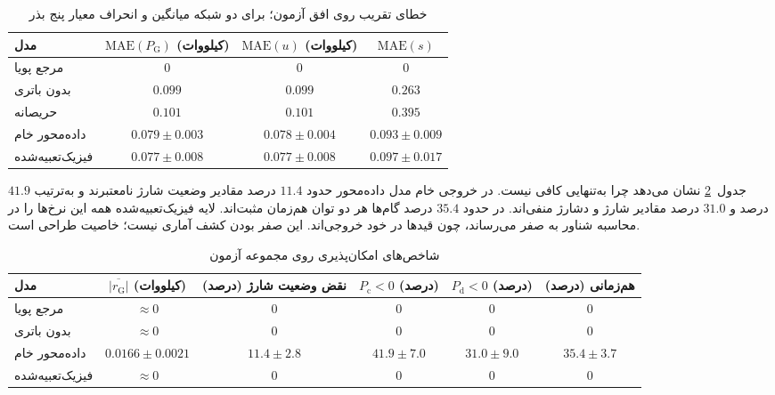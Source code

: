 \begin{table}[H]
  \centering
  \caption{خطای تقریب روی افق آزمون؛ برای دو شبکه میانگین و انحراف معیار پنج بذر}
  \label{tab:accuracy}
  \begin{tabular}{lccc}
    \toprule
    مدل & $\mathrm{MAE}(P_{\mathrm{G}})$ (کیلووات) & $\mathrm{MAE}(u)$ (کیلووات) & $\mathrm{MAE}(s)$ \\
    \midrule
    مرجع پویا & $0$ & $0$ & $0$ \\
    بدون باتری & $0{.}099$ & $0{.}099$ & $0{.}263$ \\
    حریصانه & $0{.}101$ & $0{.}101$ & $0{.}395$ \\
    داده‌محور خام & $0{.}079\pm 0{.}003$ & $0{.}078\pm 0{.}004$ & $0{.}093\pm 0{.}009$ \\
    فیزیک‌تعبیه‌شده & $0{.}077\pm 0{.}008$ & $0{.}077\pm 0{.}008$ & $0{.}097\pm 0{.}017$ \\
    \bottomrule
  \end{tabular}
\end{table}

جدول~\ref{tab:feasibility} نشان می‌دهد چرا  به‌تنهایی کافی نیست. در خروجی خام مدل داده‌محور حدود $11{.}4$ درصد مقادیر وضعیت شارژ نامعتبرند و به‌ترتیب $41{.}9$ درصد و $31{.}0$ درصد مقادیر شارژ و دشارژ منفی‌اند. در حدود $35{.}4$ درصد گام‌ها هر دو توان هم‌زمان مثبت‌اند. لایه فیزیک‌تعبیه‌شده همه این نرخ‌ها را در محاسبه شناور به صفر می‌رساند، چون قیدها در خود خروجی‌اند. این صفر بودن کشف آماری نیست؛ خاصیت طراحی است.

\begin{table}[H]
  \centering
  \caption{شاخص‌های امکان‌پذیری روی مجموعه آزمون}
  \label{tab:feasibility}
  \begin{tabular}{lccccc}
    \toprule
    مدل & $\overline{|r_{\mathrm{G}}|}$ (کیلووات) & نقض وضعیت شارژ (درصد) & $P_{\mathrm{c}}<0$ (درصد) & $P_{\mathrm{d}}<0$ (درصد) & هم‌زمانی (درصد) \\
    \midrule
    مرجع پویا & $\approx 0$ & $0$ & $0$ & $0$ & $0$ \\
    بدون باتری & $\approx 0$ & $0$ & $0$ & $0$ & $0$ \\
    داده‌محور خام & $0{.}0166\pm 0{.}0021$ & $11{.}4\pm 2{.}8$ & $41{.}9\pm 7{.}0$ & $31{.}0\pm 9{.}0$ & $35{.}4\pm 3{.}7$ \\
    فیزیک‌تعبیه‌شده & $\approx 0$ & $0$ & $0$ & $0$ & $0$ \\
    \bottomrule
  \end{tabular}
\end{table}

